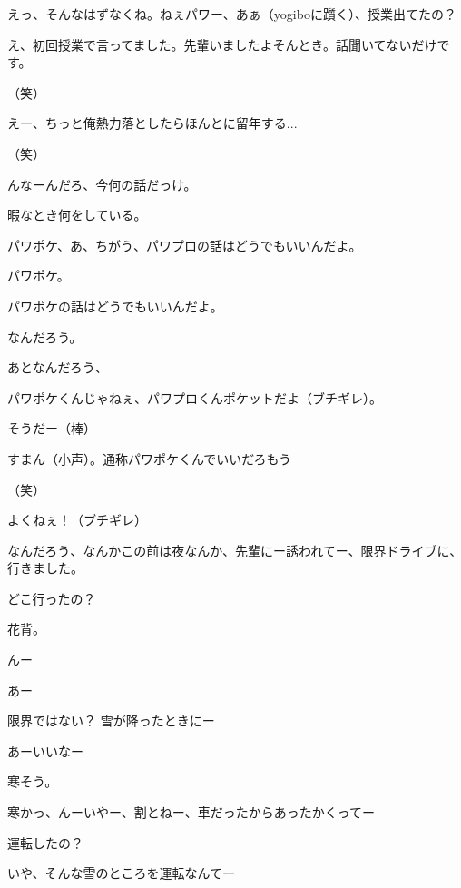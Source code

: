 \begin{multicols}{3}
{        えっ、そんなはずなくね。ねぇパワー、あぁ（yogiboに躓く）、授業出てたの？

        え、初回授業で言ってました。先輩いましたよそんとき。話聞いてないだけです。

        （笑）

        えー、ちっと俺熱力落としたらほんとに留年する...

        （笑）

        んなーんだろ、今何の話だっけ。

        暇なとき何をしている。

        パワポケ、あ、ちがう、パワプロの話はどうでもいいんだよ。

        パワポケ。

        パワポケの話はどうでもいいんだよ。

        なんだろう。

        あとなんだろう、

        パワポケくんじゃねぇ、パワプロくんポケットだよ（ブチギレ）。

        そうだー（棒）

        すまん（小声）。通称パワポケくんでいいだろもう

        （笑）

        よくねぇ！（ブチギレ）

        なんだろう、なんかこの前は夜なんか、先輩にー誘われてー、限界ドライブに、行きました。

        どこ行ったの？

        花背。

        んー

        あー

        限界ではない？ 雪が降ったときにー

        あーいいなー

        寒そう。

        寒かっ、んーいやー、割とねー、車だったからあったかくってー

        運転したの？

        いや、そんな雪のところを運転なんてー

}
\end{multicols}
